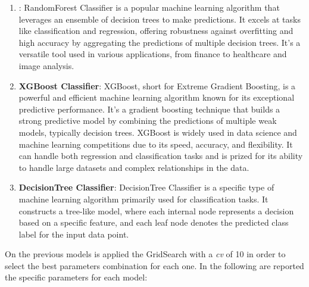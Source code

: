 \documentclass[12pt,a4paper,openright,twoside]{book}
\begin{document}
\begin{enumerate}

    \item {}: RandomForest Classifier is a popular machine learning algorithm that leverages an ensemble of decision trees to make predictions. It excels at tasks like classification and regression, offering robustness against overfitting and high accuracy by aggregating the predictions of multiple decision trees. It's a versatile tool used in various applications, from finance to healthcare and image analysis.
    
    \item \textbf{XGBoost Classifier}: XGBoost, short for Extreme Gradient Boosting, is a powerful and efficient machine learning algorithm known for its exceptional predictive performance. It's a gradient boosting technique that builds a strong predictive model by combining the predictions of multiple weak models, typically decision trees. XGBoost is widely used in data science and machine learning competitions due to its speed, accuracy, and flexibility. It can handle both regression and classification tasks and is prized for its ability to handle large datasets and complex relationships in the data.
    
    \item \textbf{DecisionTree Classifier}: DecisionTree Classifier is a specific type of machine learning algorithm primarily used for classification tasks. It constructs a tree-like model, where each internal node represents a decision based on a specific feature, and each leaf node denotes the predicted class label for the input data point.

\end{enumerate}

On the previous models is applied the GridSearch with a \emph{cv} of 10 in order to select the best parameters combination for each one. In the following are reported the specific parameters for each model:
\end{document}
